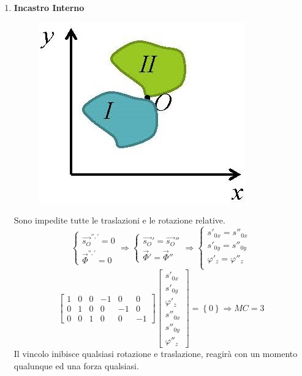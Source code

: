\documentclass{article}
\begin{document}
\begin{adjustwidth}{2in}{}
\begin{enumerate}
\item \textbf{Incastro Interno} \newline
	\begin{figure}[H]
	\centering
	\includegraphics[width=0.25\linewidth]{immagini/1.PARTE2_Pagina_09}
\end{figure}
Sono impedite tutte le traslazioni e le rotazione relative.
\[
\begin{cases}
\vec{s_O}^{'', '} = 0 \\
\vec{\Phi}^{'', '} = 0
\end{cases} \Rightarrow \begin{cases}
\vec{s_O}' = \vec{s_O}'' \\
\vec{\Phi}' = \vec{\Phi}''
\end{cases} \Rightarrow \begin{cases}
s'_{0x} = s''_{0x} \\
s'_{0y} = s''_{0y} \\
\varphi'_z = \varphi''_z \\
\end{cases}
\]
\[
\left[ \begin{array}{cccccc}
	1 & 0 & 0 & -1 & 0 & 0 \\
	0 & 1 & 0 & 0 & -1 & 0 \\
	0 & 0 & 1 & 0 & 0 & -1
\end{array}\right] \left[ \begin{array}{c}
s'_{0x} \\
s'_{0y} \\
\varphi'_z \\
s''_{0x} \\
s''_{0y} \\
\varphi''_z
\end{array}\right] = \left\lbrace 0 \right\rbrace \Rightarrow MC = 3
\]
Il vincolo inibisce qualsiasi rotazione e traslazione, reagirà con un momento qualunque ed una forza qualsiasi.


\end{enumerate}
\end{adjustwidth}
\end{document}
